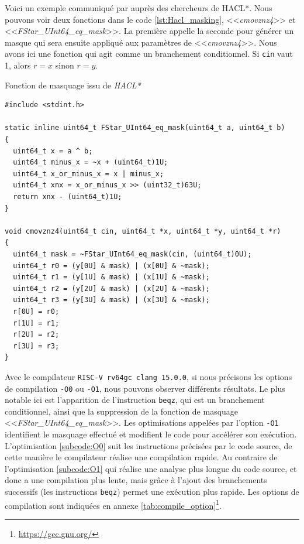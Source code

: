 Voici un exemple communiqué par \citeauthor{schneider2024breakingbadcompilersbreak} auprès des chercheurs de HACL*. Nous pouvons voir deux fonctions dans le code \ref{lst:Hacl_masking}, <<\textit{cmovznz4}>> et <<\textit{FStar\_UInt64\_eq\_mask}>>. La première appelle la seconde pour générer un masque qui sera ensuite appliqué aux paramètres de <<\textit{cmovznz4}>>. Nous avons ici une fonction qui agit comme un branchement conditionnel. Si \texttt{cin} vaut 1, alors $r = x$ sinon $r = y$.

\begin{listing}[!ht]
    \caption{Fonction de masquage issu de \textit{HACL*}}
    \label{lst:Hacl_masking}
    \begin{verbatim}
#include <stdint.h>

static inline uint64_t FStar_UInt64_eq_mask(uint64_t a, uint64_t b)
{
  uint64_t x = a ^ b;
  uint64_t minus_x = ~x + (uint64_t)1U;
  uint64_t x_or_minus_x = x | minus_x;
  uint64_t xnx = x_or_minus_x >> (uint32_t)63U;
  return xnx - (uint64_t)1U;
}

void cmovznz4(uint64_t cin, uint64_t *x, uint64_t *y, uint64_t *r)
{
  uint64_t mask = ~FStar_UInt64_eq_mask(cin, (uint64_t)0U);
  uint64_t r0 = (y[0U] & mask) | (x[0U] & ~mask);
  uint64_t r1 = (y[1U] & mask) | (x[1U] & ~mask);
  uint64_t r2 = (y[2U] & mask) | (x[2U] & ~mask);
  uint64_t r3 = (y[3U] & mask) | (x[3U] & ~mask);
  r[0U] = r0;
  r[1U] = r1;
  r[2U] = r2;
  r[3U] = r3;
}
    \end{verbatim}
\end{listing}

Avec le compilateur \texttt{RISC-V rv64gc clang 15.0.0}, si nous précisons les options de compilation \texttt{-O0} ou \texttt{-O1}, nous pouvons observer différents résultats. Le plus notable ici est l'apparition de l'instruction \texttt{beqz}, qui est un branchement conditionnel, ainsi que la suppression de la fonction de masquage <<\textit{FStar\_UInt64\_eq\_mask}>>. Les optimisations appelées par l'option \texttt{-O1} identifient le masquage effectué et modifient le code pour accélérer son exécution. L'optimisation \ref{subcode:O0} suit les instructions précisées par le code source, de cette manière le compilateur réalise une compilation rapide. Au contraire de l'optimisation \ref{subcode:O1} qui réalise une analyse plus longue du code source, et donc a une compilation plus lente, mais grâce à l'ajout des branchements successifs (les instructions \texttt{beqz}) permet une exécution plus rapide. Les options de compilation sont indiquées en annexe \ref{tab:compile_option}\footnote{\url{https://gcc.gnu.org/}}.

